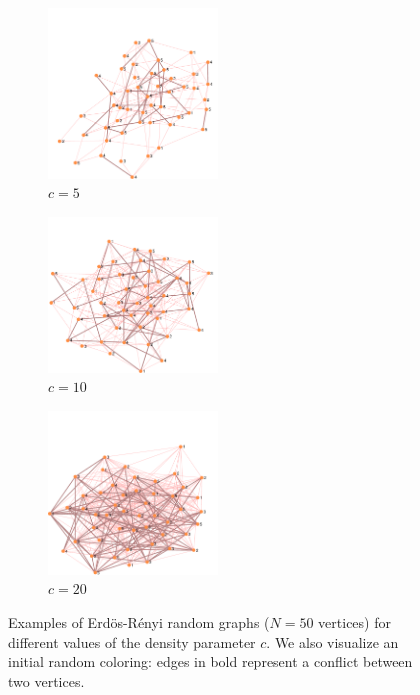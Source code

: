 \documentclass{report}
\begin{document}
  \begin{figure}
      \centering
      \begin{subfigure}[t]{4.5cm}
        \centering
        \includegraphics[width=4.5cm]{figures/random-graph-50-5-5.pdf}
        \caption{$c = 5$}
      \end{subfigure}
      \quad
      \begin{subfigure}[t]{4.5cm}
        \centering
        \includegraphics[width=4.5cm]{figures/random-graph-50-10-5.pdf}
        \caption{$c = 10$}
      \end{subfigure}
      \quad
      \begin{subfigure}[t]{4.5cm}
        \centering
        \includegraphics[width=4.5cm]{figures/random-graph-50-20-5.pdf}
        \caption{$c = 20$}
      \end{subfigure}

    \caption{Examples of Erd\"{o}s-R\'{e}nyi random graphs ($N = 50$ vertices) for different values of the density parameter $c$. We also visualize an initial random coloring: edges in bold represent a conflict between two vertices.}\label{Fig:random-graph-examples}
  \end{figure}
\end{document}
